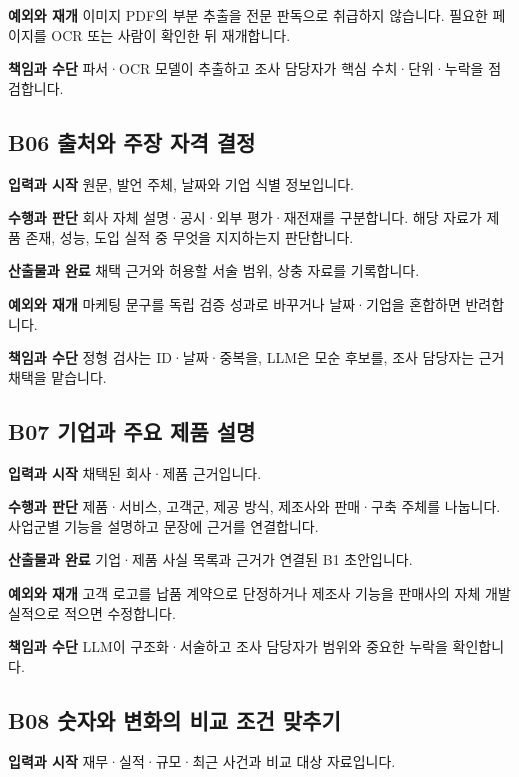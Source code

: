\documentclass[a4paper,10pt]{article}
\begin{document}
\noindent\textbf{예외와 재개} 이미지 PDF의 부분 추출을 전문 판독으로 취급하지 않습니다. 필요한 페이지를 OCR 또는 사람이 확인한 뒤 재개합니다.


\noindent\textbf{책임과 수단} 파서·OCR 모델이 추출하고 조사 담당자가 핵심 수치·단위·누락을 점검합니다.


\endgroup
\begingroup\setlength{\parskip}{3pt}
\subsection*{B06 출처와 주장 자격 결정}
\noindent\textbf{입력과 시작} 원문, 발언 주체, 날짜와 기업 식별 정보입니다.


\noindent\textbf{수행과 판단} 회사 자체 설명·공시·외부 평가·재전재를 구분합니다. 해당 자료가 제품 존재, 성능, 도입 실적 중 무엇을 지지하는지 판단합니다.


\noindent\textbf{산출물과 완료} 채택 근거와 허용할 서술 범위, 상충 자료를 기록합니다.


\noindent\textbf{예외와 재개} 마케팅 문구를 독립 검증 성과로 바꾸거나 날짜·기업을 혼합하면 반려합니다.


\noindent\textbf{책임과 수단} 정형 검사는 ID·날짜·중복을, LLM은 모순 후보를, 조사 담당자는 근거 채택을 맡습니다.


\endgroup
\begingroup\setlength{\parskip}{3pt}
\subsection*{B07 기업과 주요 제품 설명}
\noindent\textbf{입력과 시작} 채택된 회사·제품 근거입니다.


\noindent\textbf{수행과 판단} 제품·서비스, 고객군, 제공 방식, 제조사와 판매·구축 주체를 나눕니다. 사업군별 기능을 설명하고 문장에 근거를 연결합니다.


\noindent\textbf{산출물과 완료} 기업·제품 사실 목록과 근거가 연결된 B1 초안입니다.


\noindent\textbf{예외와 재개} 고객 로고를 납품 계약으로 단정하거나 제조사 기능을 판매사의 자체 개발 실적으로 적으면 수정합니다.


\noindent\textbf{책임과 수단} LLM이 구조화·서술하고 조사 담당자가 범위와 중요한 누락을 확인합니다.


\endgroup
\begingroup\setlength{\parskip}{3pt}
\subsection*{B08 숫자와 변화의 비교 조건 맞추기}
\noindent\textbf{입력과 시작} 재무·실적·규모·최근 사건과 비교 대상 자료입니다.
\end{document}
